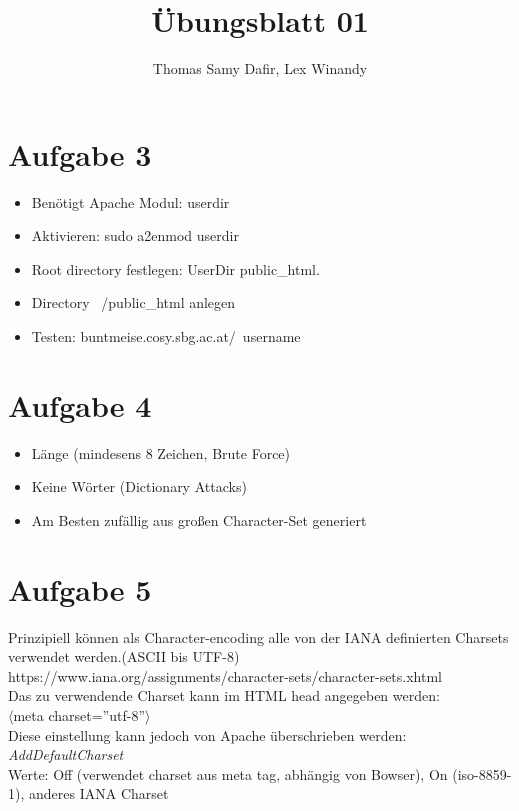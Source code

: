 \documentclass[12pt, a4paper]{report}
\title{Übungsblatt 01}
\author{Thomas Samy Dafir, Lex Winandy}
\date{}
\begin{document}
\maketitle

\section*{Aufgabe 3}
\begin{itemize}
	\item Benötigt Apache Modul: userdir
	\item Aktivieren: sudo a2enmod userdir
	\item Root directory festlegen: UserDir public\_html.
	\item Directory ~/public\_html anlegen
	\item Testen: buntmeise.cosy.sbg.ac.at/~username
\end{itemize}

\section*{Aufgabe 4}
\begin{itemize}
	\item Länge (mindesens 8 Zeichen, Brute Force)
	\item Keine Wörter (Dictionary Attacks)
	\item Am Besten zufällig aus großen Character-Set generiert 
\end{itemize}

\section*{Aufgabe 5}
Prinzipiell können als Character-encoding alle von der IANA definierten
Charsets verwendet werden.(ASCII bis UTF-8)\\
https://www.iana.org/assignments/character-sets/character-sets.xhtml\\
Das zu verwendende Charset kann im HTML head angegeben werden:\\
$\langle$meta charset=''utf-8''$\rangle$\\
Diese einstellung kann jedoch von Apache überschrieben werden:\\
\textit{AddDefaultCharset}\\
Werte: Off (verwendet charset aus meta tag, abhängig von Bowser), 
On (iso-8859-1), anderes IANA Charset
\end{document}
